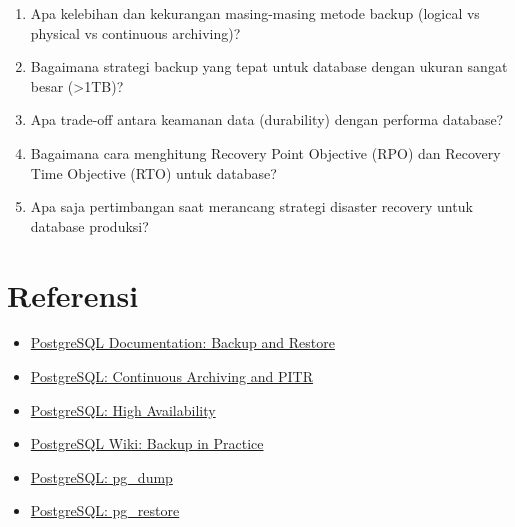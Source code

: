 \begin{enumerate}
    \item Apa kelebihan dan kekurangan masing-masing metode backup (logical vs physical vs continuous archiving)?
    
    \item Bagaimana strategi backup yang tepat untuk database dengan ukuran sangat besar (>1TB)?
    
    \item Apa trade-off antara keamanan data (durability) dengan performa database?
    
    \item Bagaimana cara menghitung Recovery Point Objective (RPO) dan Recovery Time Objective (RTO) untuk database?
    
    \item Apa saja pertimbangan saat merancang strategi disaster recovery untuk database produksi?
\end{enumerate}

\section{Referensi}

\begin{itemize}
    \item \href{https://www.postgresql.org/docs/current/backup.html}{PostgreSQL Documentation: Backup and Restore}
    \item \href{https://www.postgresql.org/docs/current/continuous-archiving.html}{PostgreSQL: Continuous Archiving and PITR}
    \item \href{https://www.postgresql.org/docs/current/high-availability.html}{PostgreSQL: High Availability}
    \item \href{https://wiki.postgresql.org/wiki/Backup_in_practice}{PostgreSQL Wiki: Backup in Practice}
    \item \href{https://www.postgresql.org/docs/current/app-pgdump.html}{PostgreSQL: pg\_dump}
    \item \href{https://www.postgresql.org/docs/current/app-pgrestore.html}{PostgreSQL: pg\_restore}
\end{itemize}